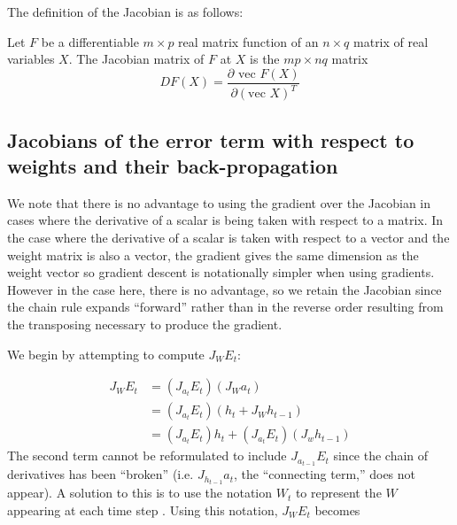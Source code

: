 The definition of the Jacobian is as follows:

\begin{definition}
  Let $F$ be a differentiable $m \times p$ real matrix function of an $n \times q$ matrix of real variables $X$. The Jacobian matrix of $F$ at $X$ is the $mp \times nq$ matrix
\begin{equation*}
  D F(X) = \frac{\partial \mbox{ vec } F(X)}{\partial (\mbox{vec } X)^T}
\end{equation*}
\end{definition}

\subsection{Jacobians of the error term with respect to weights and their back-propagation}

We note that there is no advantage to using the gradient over the Jacobian in cases where the derivative of a scalar is being taken with respect to a matrix. In the case where the derivative of a scalar is taken with respect to a vector and the weight matrix is also a vector, the gradient gives the same dimension as the weight vector so gradient descent is notationally simpler when using gradients. However in the case here, there is no advantage, so we retain the Jacobian since the chain rule expands ``forward'' rather than in the reverse order resulting from the transposing necessary to produce the gradient.

We begin by attempting to compute $J_{W} E_t$:

\begin{align*}
  J_{W} E_t & = (J_{a_t} E_t)(J_W a_t) \\
  & = (J_{a_t} E_t)(h_t + J_W h_{t-1}) \\
  & = (J_{a_t} E_t)h_t + (J_{a_t} E_t)(J_w h_{t-1})
\end{align*}
%
The second term cannot be reformulated to include $J_{a_{t-1}} E_t$ since the chain of derivatives has been ``broken'' (i.e. $J_{h_{t-1}} a_t$, the ``connecting term,'' does not appear). A solution to this is to use the notation $W_t$ to represent the $W$ appearing at each time step \cite[p. 386]{Goodfellow-et-al-2016}. Using this notation, $J_{W} E_t$ becomes

